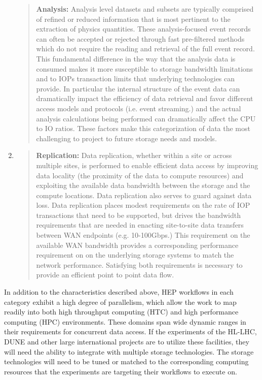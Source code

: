 \documentclass[12pt,a4paper]{article}
\begin{document}
\begin{enumerate}
  \begin{quote}
  \textbf{Analysis:} Analysis level datasets and subsets are typically
  comprised of refined or reduced information that is most pertinent to
  the extraction of physics quantities. These analysis-focused event
  records can often be accepted or rejected through fast pre-filtered
  methods which do not require the reading and retrieval of the full
  event record. This fundamental difference in the way that the analysis
  data is consumed makes it more susceptible to storage bandwidth
  limitations and to IOPs transaction limits that underlying
  technologies can provide. In particular the internal structure of the
  event data can dramatically impact the efficiency of data retrieval
  and favor different access models and protocols (i.e. event
  streaming.) and the actual analysis calculations being performed can
  dramatically affect the CPU to IO ratios. These factors make this
  categorization of data the most challenging to project to future
  storage needs and models.
  \end{quote}
\item
  \begin{quote}
  \textbf{Replication:} Data replication, whether within a site or
  across multiple sites, is performed to enable efficient data access by
  improving data locality (the proximity of the data to compute
  resources) and exploiting the available data bandwidth between the
  storage and the compute locations. Data replication also serves to
  guard against data loss. Data replication places modest requirements
  on the rate of IOP transactions that need to be supported, but drives
  the bandwidth requirements that are needed in enacting site-to-site
  data transfers between WAN endpoints (e.g. 10-100Gbps.) This
  requirement on the available WAN bandwidth provides a corresponding
  performance requirement on on the underlying storage systems to match
  the network performance. Satisfying both requirements is necessary to
  provide an efficient point to point data flow.
  \end{quote}
\end{enumerate}

In addition to the characteristics described above, HEP workflows in
each category exhibit a high degree of parallelism, which allow the work
to map readily into both high throughput computing (HTC) and high
performance computing (HPC) environments. These domains span wide
dynamic ranges in their requirements for concurrent data access. If the
experiments of the HL-LHC, DUNE and other large international projects
are to utilize these facilities, they will need the ability to integrate
with multiple storage technologies. The storage technologies will need
to be tuned or matched to the corresponding computing resources that the
experiments are targeting their workflows to execute on.
\end{document}
